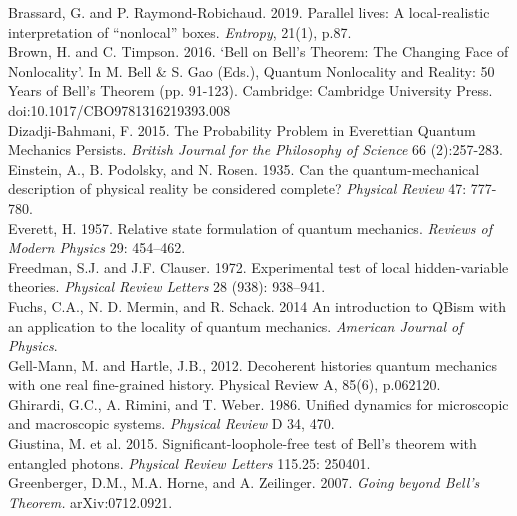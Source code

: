 \documentclass[12pt]{article}
\begin{document}
Brassard, G. and P. Raymond-Robichaud. 2019. Parallel lives: A local-realistic interpretation of ``nonlocal'' boxes. \textit{Entropy}, 21(1), p.87.\\

Brown, H. and C. Timpson. 2016. `Bell on Bell's Theorem: The Changing Face of Nonlocality'. In M. Bell \& S. Gao (Eds.), Quantum Nonlocality and Reality: 50 Years of Bell's Theorem (pp. 91-123). Cambridge: Cambridge University Press. doi:10.1017/CBO9781316219393.008\\

Dizadji-Bahmani, F. 2015. The Probability Problem in Everettian Quantum Mechanics Persists.
\textit{British Journal for the Philosophy of Science} 66 (2):257-283.
\\


Einstein, A., B. Podolsky, and N. Rosen. 1935. Can the quantum-mechanical description of physical reality be considered complete? \textit{Physical Review} 47: 777-780.\\

Everett, H. 1957. Relative state formulation of quantum mechanics. \textit{Reviews of Modern Physics} 29: 454–462. \\

Freedman, S.J. and J.F. Clauser. 1972. Experimental test of local hidden-variable theories. \textit{Physical Review Letters} 28 (938): 938–941.\\

Fuchs, C.A., N. D. Mermin, and R. Schack.  2014 An introduction to QBism with an application to the locality of quantum mechanics. \textit{American Journal of Physics}.\\

Gell-Mann, M. and Hartle, J.B., 2012. Decoherent histories quantum mechanics with one real fine-grained history. Physical Review A, 85(6), p.062120.\\

Ghirardi, G.C., A. Rimini, and T. Weber. 1986. Unified dynamics for microscopic and macroscopic systems. \textit{Physical Review} D 34, 470.\\

Giustina, M. et al. 2015. Significant-loophole-free test of Bell’s theorem with entangled photons. \textit{Physical Review Letters} 115.25: 250401.\\

Greenberger, D.M., M.A. Horne, and A. Zeilinger. 2007. \textit{Going beyond Bell's Theorem.} arXiv:0712.0921.\\
\end{document}
